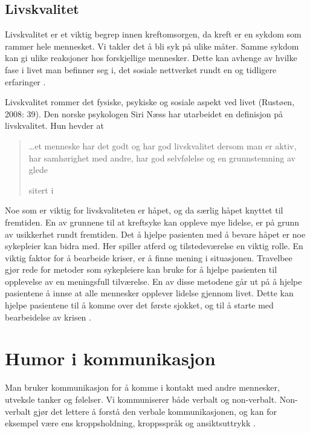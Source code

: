 \subsection{Livskvalitet}

Livskvalitet er et viktig begrep innen kreftomsorgen, da kreft er en sykdom som
rammer hele mennesket. Vi takler det å bli syk på ulike måter. Samme sykdom kan
gi ulike reaksjoner hos forskjellige mennesker. Dette kan avhenge av hvilke
fase i livet man befinner seg i, det sosiale nettverket rundt en og tidligere
erfaringer \cite[s.~39]{rustoen2008}.

Livskvalitet rommer det fysiske, psykiske og sosiale aspekt ved livet (Rustøen,
2008: 39). Den norske psykologen Siri Næss har utarbeidet en definisjon på
livskvalitet. Hun hevder at \blockquote[{sitert i
}]{\ldots et menneske har det godt og har god
livskvalitet dersom man er aktiv, har samhørighet med andre, har god
selvfølelse og en grunnstemning av glede}.

Noe som er viktig for livskvaliteten er håpet, og da særlig håpet knyttet til
fremtiden. En av grunnene til at kreftsyke kan oppleve mye lidelse, er på grunn
av usikkerhet rundt fremtiden. Det å hjelpe pasienten med å bevare håpet er noe
sykepleier kan bidra med. Her spiller atferd og tilstedeværelse en viktig
rolle. En viktig faktor for å bearbeide kriser, er å finne mening i
situasjonen. Travelbee gjør rede for metoder som sykepleiere kan bruke for å
hjelpe pasienten til opplevelse av en meningsfull tilværelse. En av disse
metodene går ut på å hjelpe pasientene å innse at alle mennesker opplever
lidelse gjennom livet. Dette kan hjelpe pasientene til å komme over det første
sjokket, og til å starte med bearbeidelse av krisen
\cite[s.~40--42]{rustoen2008}.

\section{Humor i kommunikasjon}

Man bruker kommunikasjon for å komme i kontakt med andre mennesker, utveksle
tanker og følelser. Vi kommuniserer både verbalt og non-verbalt. Non-verbalt
gjør det lettere å forstå den verbale kommunikasjonen, og kan for eksempel være
ens kroppsholdning, kroppsspråk og ansiktsuttrykk
\cite[s.~65--67]{reitan2008.kommunikasjon}.

